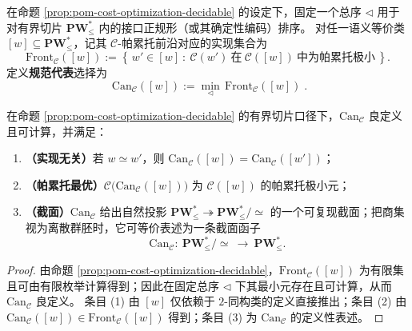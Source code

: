 \begin{definition}\label{def:pom-cost-canonical-representative}
在命题 \ref{prop:pom-cost-optimization-decidable} 的设定下，固定一个总序 \(\triangleleft\) 用于对有界切片 \(\mathbf{PW}^{\ast}_{\le}\) 内的接口正规形（或其确定性编码）排序。
对任一语义等价类 \([w]\subseteq \mathbf{PW}^{\ast}_{\le}\)，记其 \(\mathcal{C}\)-帕累托前沿对应的实现集合为
\[
\mathrm{Front}_{\mathcal C}([w])
:=
\left\{\,w'\in [w]\ :\ \mathcal{C}(w')\ \text{在}\ \mathcal{C}([w])\ \text{中为帕累托极小}\,\right\}.
\]
定义\textbf{规范代表}选择为
\[
\boxed{\;
\mathrm{Can}_{\mathcal C}([w])
:=
\min_{\triangleleft}\,\mathrm{Front}_{\mathcal C}([w])\; }.
\]
\end{definition}

\begin{corollary}\label{cor:pom-cost-canonical-representative-functor}
在命题 \ref{prop:pom-cost-optimization-decidable} 的有界切片口径下，\(\mathrm{Can}_{\mathcal C}\) 良定义且可计算，并满足：
\begin{enumerate}
  \item \textbf{（实现无关）}若 \(w\simeq w'\)，则 \(\mathrm{Can}_{\mathcal C}([w])=\mathrm{Can}_{\mathcal C}([w'])\)；
  \item \textbf{（帕累托最优）}\(\mathcal{C}\bigl(\mathrm{Can}_{\mathcal C}([w])\bigr)\) 为 \(\mathcal{C}([w])\) 的帕累托极小元；
  \item \textbf{（截面）}\(\mathrm{Can}_{\mathcal C}\) 给出自然投影 \(\mathbf{PW}^{\ast}_{\le}\twoheadrightarrow \mathbf{PW}^{\ast}_{\le}/\!\!\simeq\) 的一个可复现截面；把商集视为离散群胚时，它可等价表述为一条截面函子
  \[
  \mathrm{Can}_{\mathcal C}:\ \mathbf{PW}^{\ast}_{\le}/\!\!\simeq\ \longrightarrow\ \mathbf{PW}^{\ast}_{\le}.
  \]
\end{enumerate}
\end{corollary}
\begin{proof}
由命题 \ref{prop:pom-cost-optimization-decidable}，\(\mathrm{Front}_{\mathcal C}([w])\) 为有限集且可由有限枚举计算得到；因此在固定总序 \(\triangleleft\) 下其最小元存在且可计算，从而 \(\mathrm{Can}_{\mathcal C}\) 良定义。
条目 (1) 由 \([w]\) 仅依赖于 \(2\)-同构类的定义直接推出；条目 (2) 由 \(\mathrm{Can}_{\mathcal C}([w])\in \mathrm{Front}_{\mathcal C}([w])\) 得到；条目 (3) 为 \(\mathrm{Can}_{\mathcal C}\) 的定义性表述。
\end{proof}

